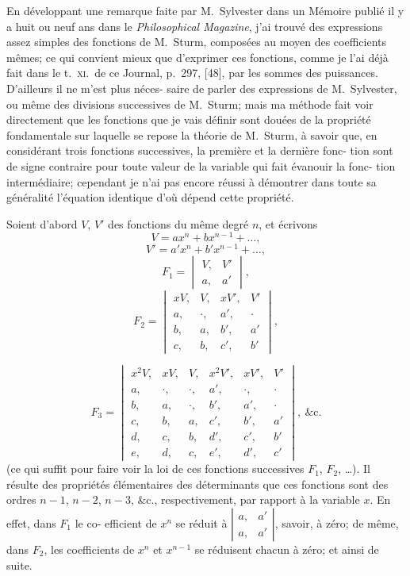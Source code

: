 \documentclass[11pt]{article}
\begin{document}
\medskip

En d\'eveloppant une remarque faite par M.~Sylvester dans un M\'emoire publi\'e il y
a huit ou neuf ans dans le \textit{Philosophical Magazine}, j'ai trouv\'e des expressions assez
simples des fonctions de M.~Sturm, compos\'ees au moyen des coefficients m\^emes; ce qui
convient mieux que d'exprimer ces fonctions, comme je l'ai d\'ej\`a fait dans le t.~\textsc{xi}.\ de
ce Journal, p.~297, [48], par les sommes des puissances. D'ailleurs il ne m'est plus n\'eces-
saire de parler des expressions de M.~Sylvester, ou m\^eme des divisions successives de
M.~Sturm; mais ma m\'ethode fait voir directement que les fonctions que je vais d\'efinir
sont dou\'ees de la propri\'et\'e fondamentale sur laquelle se repose la th\'eorie de M.~Sturm,
\`a savoir que, en consid\'erant trois fonctions successives, la premi\`ere et la derni\`ere fonc-
tion sont de signe contraire pour toute valeur de la variable qui fait \'evanouir la fonc-
tion interm\'ediaire; cependant je n'ai pas encore r\'eussi \`a d\'emontrer dans toute sa
g\'en\'eralit\'e l'\'equation identique d'o\`u d\'epend cette propri\'et\'e.

\medskip
Soient d'abord $V$, $V'$ des fonctions du m\^eme degr\'e $n$,
et \'ecrivons
\[
V = ax^{n} + bx^{n - 1} + \ldots,
\]
\[
V' = a'x^{n} + b'x^{n - 1} + \ldots,
\]
\[
F_{1} = \begin{vmatrix} V, & V' \\ a, & a' \end{vmatrix},
\]
\[
F_{2} = \begin{vmatrix} xV, & V, & xV', & V' \\ a, & \cdot, & a', & \cdot \\ b, & a, & b', & a' \\ c, & b, & c', & b' \end{vmatrix},
\]

\[
F_{3} = \begin{vmatrix} x^{2}V, & xV, & V, & x^{2}V', & xV', & V' \\ a, & \cdot, & \cdot, & a', & \cdot, & \cdot \\ b, & a, & \cdot, & b', & a', & \cdot \\ c, & b, & a, & c', & b', & a' \\ d, & c, & b, & d', & c', & b' \\ e, & d, & c, & e', & d', & c' \end{vmatrix},\ \&\text{c.}
\]
(ce qui suffit pour faire voir la loi de ces fonctions successives $F_{1}$, $F_{2}$, \ldots). Il r\'esulte
des propri\'et\'es \'el\'ementaires des d\'eterminants que ces fonctions sont des ordres $n - 1$,
$n - 2$, $n - 3$, \&c., respectivement, par rapport \`a la variable $x$. En effet, dans $F_{1}$ le co-
efficient de $x^{n}$ se r\'eduit \`a $\left|\begin{smallmatrix}a, & a'\\ a, & a'\end{smallmatrix}\right|$, savoir, \`a z\'ero; de m\^eme, dans $F_{2}$, les coefficients
de $x^{n}$ et $x^{n - 1}$ se r\'eduisent chacun \`a z\'ero; et ainsi de suite.
\end{document}
